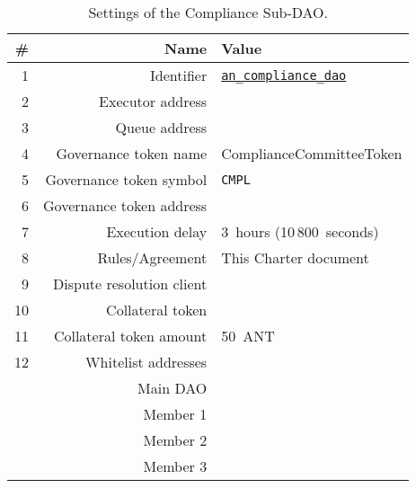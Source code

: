 \begin{table}[h!]
	\caption{Settings of the Compliance Sub-DAO.}
	\centering
	\begin{tabular}{rrl}
		\toprule
		\# & Name & Value \\
		\midrule
		 1 & Identifier 				& \href{https://govern.aragon.org/\#/daos/an_compliance_dao}{\texttt{an\_compliance\_dao}}\\
		 2 & Executor address			& \cmplSubDaoAddr\\
		 3 & Queue address				& \cmplSubDaoQueueAddr\\
		 4 & Governance token name		& ComplianceCommitteeToken\\
		 5 & Governance token symbol	& \texttt{CMPL}\\
		 6 & Governance token address	& \cmplSubDaoTokenAddr\\
		 7 & Execution delay			& 3~hours (10\,800~seconds)\\
		 8 & Rules/Agreement			& This Charter document\\
		 9 & Dispute resolution client	& \aragonCourtAddr\\
		10 & Collateral token			& \antTokenAddr\\
		11 & Collateral token amount	& 50~\ac{ANT}\\
		12 & Whitelist addresses 		& \\
			& Main \ac{DAO} 			& \mainDaoAddr\\
			& Member 1 					& \cmplSubDaoMemberAddrI\\
			& Member 2					& \cmplSubDaoMemberAddrII\\
			& Member 3					& \cmplSubDaoMemberAddrIII\\
		\bottomrule
	\end{tabular}
\end{table}


